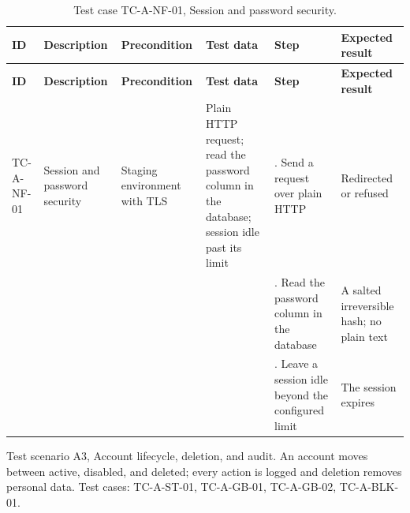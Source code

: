 {\footnotesize{}\renewcommand{\arraystretch}{1.1}
\begin{longtable}{|>{\raggedright\arraybackslash}p{}|>{\raggedright\arraybackslash}p{}|>{\raggedright\arraybackslash}p{}|>{\raggedright\arraybackslash}p{}|>{\raggedright\arraybackslash}p{}|>{\raggedright\arraybackslash}p{}|}
\caption{Test case TC-A-NF-01, Session and password security.} \\
\hline
\textbf{ID} & \textbf{Description} & \textbf{Precondition} & \textbf{Test data} & \textbf{Step} & \textbf{Expected result} \\ \hline
\endfirsthead
\hline
\textbf{ID} & \textbf{Description} & \textbf{Precondition} & \textbf{Test data} & \textbf{Step} & \textbf{Expected result} \\ \hline
\endhead
TC-A-NF-01 & Session and password security & Staging environment with TLS & Plain HTTP request; read the password column in the database; session idle past its limit & 1. Send a request over plain HTTP & Redirected or refused \\ \cline{5-6}
 &  &  &  & 2. Read the password column in the database & A salted irreversible hash; no plain text \\ \cline{5-6}
 &  &  &  & 3. Leave a session idle beyond the configured limit & The session expires \\ \hline
\end{longtable}
}

Test scenario A3, Account lifecycle, deletion, and audit. An account moves between active, disabled, and deleted; every action is logged and deletion removes personal data. Test cases: TC-A-ST-01, TC-A-GB-01, TC-A-GB-02, TC-\allowbreak{}A-\allowbreak{}BLK-\allowbreak{}01.

